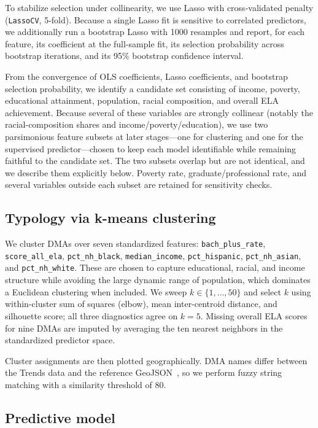 \documentclass[11pt]{article}
\begin{document}
To stabilize selection under collinearity, we use Lasso with cross-validated penalty (\texttt{LassoCV}, 5-fold). Because a single Lasso fit is sensitive to correlated predictors, we additionally run a bootstrap Lasso with 1000 resamples and report, for each feature, its coefficient at the full-sample fit, its selection probability across bootstrap iterations, and its 95\% bootstrap confidence interval.

From the convergence of OLS coefficients, Lasso coefficients, and bootstrap selection probability, we identify a candidate set consisting of income, poverty, educational attainment, population, racial composition, and overall ELA achievement. Because several of these variables are strongly collinear (notably the racial-composition shares and income/poverty/education), we use two parsimonious feature subsets at later stages---one for clustering and one for the supervised predictor---chosen to keep each model identifiable while remaining faithful to the candidate set. The two subsets overlap but are not identical, and we describe them explicitly below. Poverty rate, graduate/professional rate, and several variables outside each subset are retained for sensitivity checks.

\subsection{Typology via k-means clustering}

We cluster DMAs over seven standardized features: \texttt{bach\_plus\_rate}, \texttt{score\_all\_ela}, \texttt{pct\_nh\_black}, \texttt{median\_income}, \texttt{pct\_hispanic}, \texttt{pct\_nh\_asian}, and \texttt{pct\_nh\_white}. These are chosen to capture educational, racial, and income structure while avoiding the large dynamic range of population, which dominates a Euclidean clustering when included. We sweep $k \in \{1, \ldots, 50\}$ and select $k$ using within-cluster sum of squares (elbow), mean inter-centroid distance, and silhouette score; all three diagnostics agree on $k=5$. Missing overall ELA scores for nine DMAs are imputed by averaging the ten nearest neighbors in the standardized predictor space.

Cluster assignments are then plotted geographically. DMA names differ between the Trends data and the reference GeoJSON~\citep{simzou}, so we perform fuzzy string matching with a similarity threshold of 80.

\subsection{Predictive model}
\end{document}
